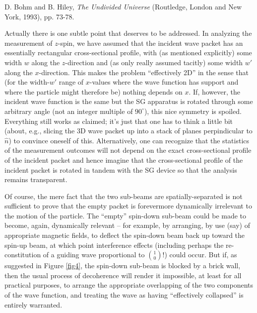 \documentclass[aps,prc,onecolumn,letterpaper,floatfix,12pt]{revtex4}
\begin{document}
\begin{thebibliography}{99}
  D. Bohm and B. Hiley, \emph{The Undivided Universe}
  (Routledge, London and New York, 1993), pp. 73-78.



  Actually there is one subtle point that deserves to
  be addressed.  In analyzing the measurement of $z$-spin, we have
  assumed that the incident wave packet has an essentially rectangular
  cross-sectional profile, with (as mentioned explicitly) some width
  $w$ along the $z$-direction and (as only really assumed tacitly)
  some width $w'$ along the $x$-direction.  This makes the problem
  ``effectively 2D'' in the sense that (for the width-$w'$ range of
  $x$-values where the wave function has support and where the
  particle might therefore be) nothing depends on $x$.  If, however,
  the incident wave function is the same but the 
  SG apparatus is rotated through some arbitrary angle (not an integer 
  multiple of $90^\circ$), this nice symmetry is spoiled.  Everything
  still works as claimed; it's just that one has to think a little bit
  (about, e.g., slicing the 3D wave packet up into a stack of planes
  perpindicular to $\hat{n}$) to convince oneself of this.
  Alternatively, one can recognize that the statistics of the
  measurement outcomes will not depend on the exact cross-sectional
  profile of the incident packet and hence imagine that the
  cross-sectional profile of the incident packet is rotated in tandem
  with the SG device so that the analysis remains transparent.  




  Of course, the mere fact that the two sub-beams are
  spatially-separated is not sufficient to prove that the empty packet
  is forevermore dynamically irrelevant to the motion of the
  particle.  The ``empty'' spin-down sub-beam
  could be made to become, again, dynamically relevant -- for example, 
  by arranging, by use (say) of
  appropriate magnetic fields, to deflect the spin-down beam back up
  toward the spin-up beam, at which point interference effects
  (including perhaps the re-constitution of a guiding wave
  proportional to $\binom{1}{0}$!) could occur.  But if, as suggested in Figure \ref{fig4},
  the spin-down sub-beam is blocked by a brick wall, then the usual
  process of decoherence will render it impossible, at least for all
  practical purposes, to arrange the appropriate overlapping of the
  two components of the wave function, and treating the wave as having
  ``effectively collapsed'' is entirely warranted.





\end{thebibliography}
\end{document}
